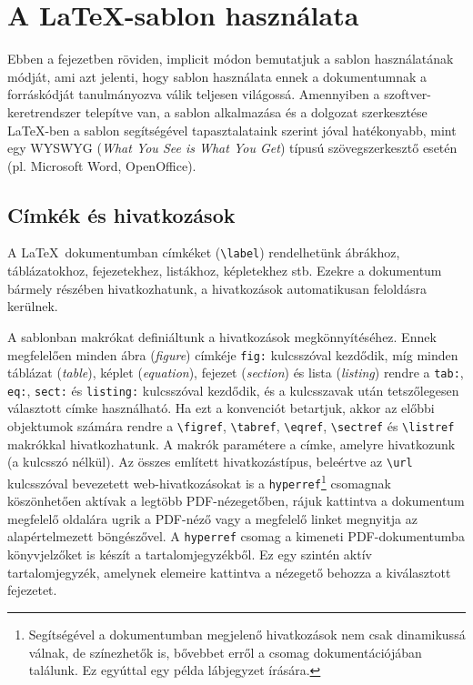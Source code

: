 \chapter{A \LaTeX-sablon használata}

Ebben a fejezetben röviden, implicit módon bemutatjuk a sablon használatának módját, ami azt jelenti, hogy sablon használata ennek a dokumentumnak a forráskódját tanulmányozva válik teljesen világossá. Amennyiben a szoftver-keretrendszer telepítve van, a sablon alkalmazása és a dolgozat szerkesztése \LaTeX-ben a sablon segítségével tapasztalataink szerint jóval hatékonyabb, mint egy WYSWYG (\emph{What You See is What You Get}) típusú szövegszerkesztő esetén (pl. Microsoft Word, OpenOffice).

\section{Címkék és hivatkozások}
A \LaTeX~dokumentumban címkéket (\verb+\label+) rendelhetünk ábrákhoz, táblázatokhoz, fejezetekhez, listákhoz, képletekhez stb. Ezekre a dokumentum bármely részében hivatkozhatunk, a hivatkozások automatikusan feloldásra kerülnek.

A sablonban makrókat definiáltunk a hivatkozások megkönnyítéséhez. Ennek megfelelően minden ábra (\emph{figure}) címkéje \verb+fig:+ kulcsszóval kezdődik, míg minden táblázat (\emph{table}), képlet (\emph{equation}), fejezet (\emph{section}) és lista (\emph{listing}) rendre a \verb+tab:+, \verb+eq:+, \verb+sect:+ és \verb+listing:+ kulcsszóval kezdődik, és a kulcsszavak után tetszőlegesen választott címke használható. Ha ezt a konvenciót betartjuk, akkor az előbbi objektumok számára rendre a \verb+\figref+, \verb+\tabref+, \verb+\eqref+, \verb+\sectref+ és \verb+\listref+ makrókkal hivatkozhatunk. A makrók paramétere a címke, amelyre hivatkozunk (a kulcsszó nélkül). Az összes említett hivatkozástípus, beleértve az \verb+\url+ kulcsszóval bevezetett web-hivatkozásokat is a  \verb+hyperref+\footnote{Segítségével a dokumentumban megjelenő hivatkozások nem csak dinamikussá válnak, de színezhetők is, bővebbet erről a csomag dokumentációjában találunk. Ez egyúttal egy példa lábjegyzet írására.} csomagnak köszönhetően aktívak a legtöbb PDF-nézegetőben, rájuk kattintva a dokumentum megfelelő oldalára ugrik a PDF-néző vagy a megfelelő linket megnyitja az alapértelmezett böngészővel. A \verb+hyperref+ csomag a kimeneti PDF-dokumentumba könyvjelzőket is készít a tartalomjegyzékből. Ez egy szintén aktív tartalomjegyzék, amelynek elemeire kattintva a nézegető behozza a kiválasztott fejezetet.


